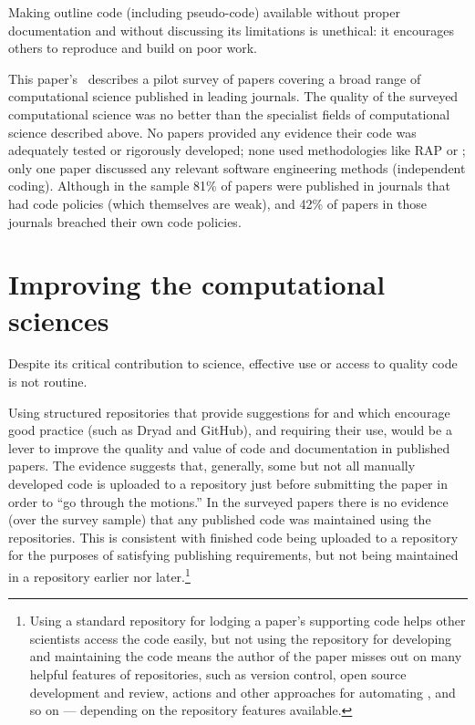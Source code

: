 \documentclass{comjnl}
\begin{document}
Making outline code (including pseudo-code) available without proper documentation and without discussing its limitations is unethical: it encourages others to reproduce and build on poor work. 

This paper's \supplement\ describes a pilot survey of papers covering a broad range of computational science published in leading journals. The quality of the surveyed computational science was no better than the specialist fields of computational science described above. No papers provided any evidence their code was adequately tested or rigorously developed; none used methodologies like RAP or \RAPstarp; only one paper discussed any relevant software engineering methods (independent coding). Although in the sample 81\% of papers were published in journals that had code policies (which themselves are weak), and 42\% of papers in those journals breached their own code policies.

\section{Improving the computational sciences}
\label{section-discussion}
\begin{change}
Despite its critical contribution to science, effective use or access to quality code is not routine. 
\end{change} 
Using structured repositories that provide suggestions for and which encourage good practice (such as Dryad and GitHub), and requiring their use, would be a lever to improve the quality and value of code and documentation in published papers. The evidence suggests that, generally, some but not all manually developed code is uploaded to a repository just before submitting the paper in order to ``go through the motions.'' In the surveyed papers there is no evidence (over the survey sample) that any published code was maintained using the repositories. This is consistent with finished code being uploaded to a repository for the purposes of satisfying publishing requirements, but not being maintained in a repository earlier nor later.\footnote{Using a standard repository for lodging a paper's supporting code helps other scientists access the code easily, but not using the repository for developing and maintaining the code means the author of the paper misses out on many helpful features of repositories, such as version control, open source development and review, actions and other approaches for automating \RAPstarp, and so on --- depending on the repository features available.}
\end{document}
